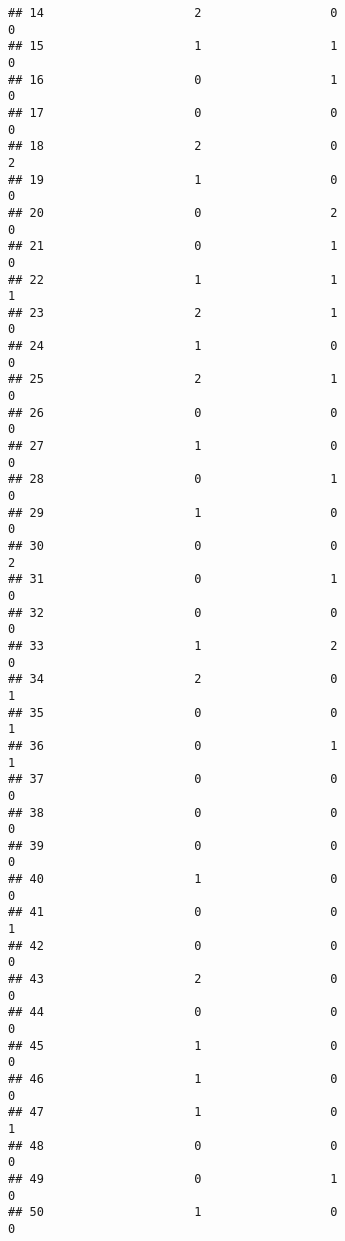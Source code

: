 \documentclass[
]{article}
\begin{document}
\begin{verbatim}
## 14                     2                  0                        0
## 15                     1                  1                        0
## 16                     0                  1                        0
## 17                     0                  0                        0
## 18                     2                  0                        2
## 19                     1                  0                        0
## 20                     0                  2                        0
## 21                     0                  1                        0
## 22                     1                  1                        1
## 23                     2                  1                        0
## 24                     1                  0                        0
## 25                     2                  1                        0
## 26                     0                  0                        0
## 27                     1                  0                        0
## 28                     0                  1                        0
## 29                     1                  0                        0
## 30                     0                  0                        2
## 31                     0                  1                        0
## 32                     0                  0                        0
## 33                     1                  2                        0
## 34                     2                  0                        1
## 35                     0                  0                        1
## 36                     0                  1                        1
## 37                     0                  0                        0
## 38                     0                  0                        0
## 39                     0                  0                        0
## 40                     1                  0                        0
## 41                     0                  0                        1
## 42                     0                  0                        0
## 43                     2                  0                        0
## 44                     0                  0                        0
## 45                     1                  0                        0
## 46                     1                  0                        0
## 47                     1                  0                        1
## 48                     0                  0                        0
## 49                     0                  1                        0
## 50                     1                  0                        0

\end{verbatim}
\end{document}
